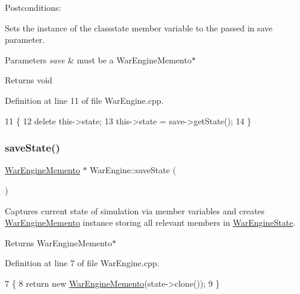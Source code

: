 Postconditions\+:
\begin{DoxyItemize}
\item Sets the instance of the class\textquotesingle{}state member variable to the passed in save parameter.
\end{DoxyItemize}


\begin{DoxyParams}{Parameters}
{\em save} & must be a War\+Engine\+Memento$\ast$ \\
\hline
\end{DoxyParams}
\begin{DoxyReturn}{Returns}
void 
\end{DoxyReturn}


Definition at line 11 of file War\+Engine.\+cpp.


\begin{DoxyCode}
11                                                \{
12     \textcolor{keyword}{delete} this->state;
13     this->state = save->getState();
14 \}
\end{DoxyCode}
\mbox{\label{classWarEngine_afe7e71964cca280d52f4298e97e1a8d7}} 
\subsubsection{\texorpdfstring{save\+State()}{saveState()}}
{\footnotesize\ttfamily \hyperlink{classWarEngineMemento}{War\+Engine\+Memento} $\ast$ War\+Engine\+::save\+State (\begin{DoxyParamCaption}{ }\end{DoxyParamCaption})}



Captures current state of simulation via member variables and creates \hyperlink{classWarEngineMemento}{War\+Engine\+Memento} instance storing all relevant members in \hyperlink{classWarEngineState}{War\+Engine\+State}. 

\begin{DoxyReturn}{Returns}
War\+Engine\+Memento$\ast$ 
\end{DoxyReturn}


Definition at line 7 of file War\+Engine.\+cpp.


\begin{DoxyCode}
7                                        \{
8     \textcolor{keywordflow}{return} \textcolor{keyword}{new} \hyperlink{classWarEngineMemento}{WarEngineMemento}(state->clone());
9 \}
\end{DoxyCode}
\mbox{\label{classWarEngine_ad3204f345ee8d36a37e8d47700420825}} 
